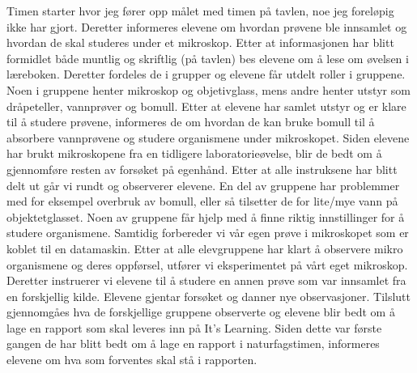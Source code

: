 \documentclass[main.tex]{subfiles}
\begin{document}
Timen starter hvor jeg fører opp målet med timen på tavlen, noe jeg foreløpig ikke har gjort. Deretter 
informeres elevene om hvordan prøvene ble innsamlet
og hvordan de skal studeres under et mikroskop. Etter at informasjonen har blitt formidlet både
muntlig og skriftlig (på tavlen) bes elevene om å lese om øvelsen i læreboken. Deretter
fordeles de i grupper og elevene får utdelt roller i gruppene. Noen i gruppene henter
mikroskop og objetivglass, mens andre henter utstyr som dråpeteller, vannprøver og bomull.
Etter at elevene har samlet utstyr og er klare til å studere prøvene, informeres de
om hvordan de kan bruke bomull til å absorbere vannprøvene og studere organismene under mikroskopet.
Siden elevene har brukt mikroskopene fra en tidligere laboratorieøvelse, blir de bedt om å 
gjennomføre resten av forsøket på egenhånd. Etter at alle instruksene har blitt delt ut går vi
rundt og observerer elevene. 
En del av gruppene har problemmer med for eksempel overbruk av bomull, 
eller så tilsetter de for lite/mye vann på objektetglasset. Noen av gruppene får hjelp med å finne 
riktig innstillinger for å studere organismene. 
Samtidig forbereder vi vår egen prøve i mikroskopet som er koblet til en datamaskin. Etter at alle elevgruppene 
har klart å observere mikro organismene og deres oppførsel, utfører vi eksperimentet på vårt eget mikroskop.
Deretter instruerer vi elevene til å studere en annen prøve som var innsamlet fra en forskjellig kilde. Elevene 
gjentar forsøket og danner nye observasjoner. 
Tilslutt gjennomgåes hva de forskjellige gruppene observerte og elevene blir bedt om å lage en rapport som skal 
leveres inn på It's Learning. Siden dette var første gangen de har blitt bedt om å lage en rapport i naturfagstimen, 
informeres elevene om hva som forventes skal stå i rapporten.
\end{document}
